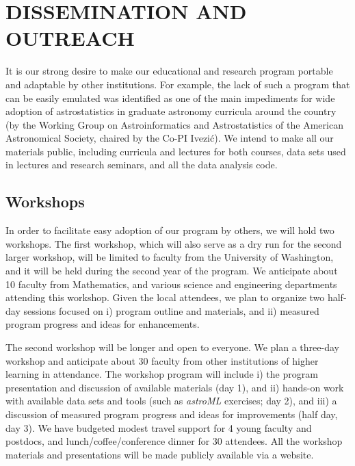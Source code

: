 \section{DISSEMINATION AND OUTREACH}
\label{sec:outreach}

\vspace{-0.8em}
It is our strong desire to make our educational and research
program portable and adaptable by other institutions. For example, 
the lack of such a program that can be easily emulated was identified 
as one of the main impediments for wide adoption of astrostatistics
in graduate astronomy curricula around the country (by the Working 
Group on Astroinformatics and Astrostatistics of the American Astronomical
Society, chaired by the Co-PI Ivezi\'{c}).  We intend to make all our
materials public, including curricula and lectures for both courses,
data sets used in lectures and research seminars, and all the data
analysis code. 


\subsection{Workshops} 
\label{sec:workshop}

\vspace{-0.8em}
In order to facilitate easy adoption of our program by others, we will
hold two workshops. The first workshop, which will also serve as a dry
run for the second larger workshop, will be limited to faculty from
the University of Washington, and it will be held during the second
year of the program. We anticipate about 10 faculty from Mathematics,
and various
science and engineering departments attending this workshop. Given the
local attendees, we plan to organize two half-day sessions focused on
i) program outline and materials, and ii) measured program progress
and ideas for enhancements.

The second workshop will be longer and open to everyone. We plan a 
three-day workshop and anticipate about 30 faculty from other
institutions of higher learning in attendance. The workshop program
will include i) the program presentation and discussion of available 
materials (day 1), and ii) hands-on work with available data sets and
tools (such as {\it astroML} exercises; day 2), and iii) a discussion
of measured program progress and ideas for improvements (half day, day
3). We have budgeted modest travel support for 4 young faculty and
postdocs, and lunch/coffee/conference dinner for 30 attendees. 
All the workshop materials and presentations will be made publicly
available via a website. 
